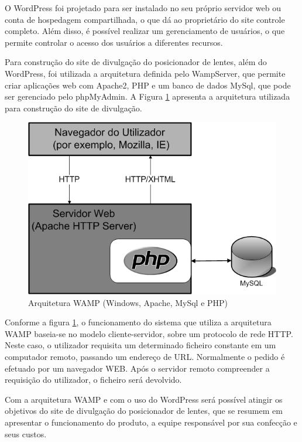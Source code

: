 O WordPress foi projetado para ser instalado no seu próprio servidor web ou conta de hospedagem compartilhada, o que dá ao proprietário do site controle completo. Além disso, é possível realizar um gerenciamento de usuários, o que permite controlar o acesso dos usuários a diferentes recursos.
	
Para construção do site de divulgação do posicionador de lentes, além do WordPress, foi utilizada a arquitetura definida pelo WampServer, que permite criar aplicações web com Apache2, PHP e um banco de dados MySql, que pode ser gerenciado pelo phpMyAdmin. A Figura \ref{arquitetura} apresenta a arquitetura utilizada para construção do site de divulgação.


\begin{figure}[H]
		\centering
			\includegraphics[scale=1.0]{figuras/arquitetura.png}
		\caption{Arquitetura WAMP (Windows, Apache, MySql e PHP)}
		\label{arquitetura}
\end{figure}

Conforme a figura \ref{arquitetura}, o funcionamento do sistema que utiliza a arquitetura WAMP baseia-se no modelo cliente-servidor, sobre um protocolo de rede HTTP. Neste caso, o utilizador requisita um determinado ficheiro constante em um computador remoto, passando um endereço de URL. Normalmente o pedido é efetuado por um navegador WEB. Após o servidor remoto compreender a requisição do utilizador, o ficheiro será devolvido.
	
Com a arquitetura WAMP e com o uso do WordPress será possível atingir os objetivos do site de divulgação do posicionador de lentes, que se resumem em apresentar o funcionamento do produto, a equipe responsável por sua confecção e seus custos.




